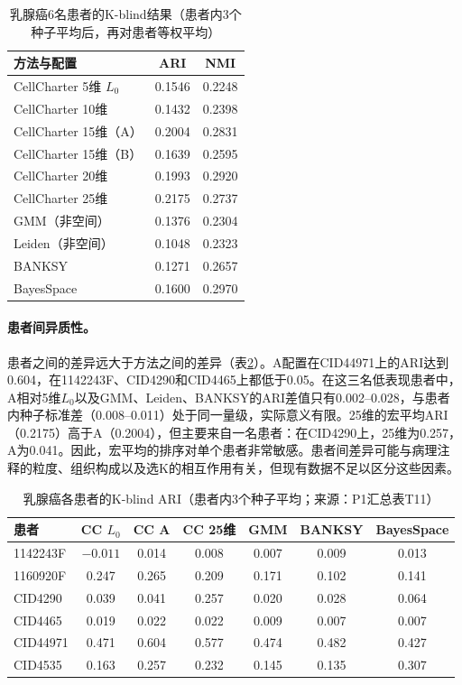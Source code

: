\begin{table}[htbp]
\centering
\caption{乳腺癌6名患者的K-blind结果（患者内3个种子平均后，再对患者等权平均）}
\label{tab:cc-external-p1}
\small
\begin{tabular}{lcc}
\toprule
方法与配置 & ARI & NMI\\
\midrule
CellCharter 5维 $L_0$ & 0.1546 & 0.2248\\
CellCharter 10维 & 0.1432 & 0.2398\\
CellCharter 15维（A） & 0.2004 & 0.2831\\
CellCharter 15维（B） & 0.1639 & 0.2595\\
CellCharter 20维 & 0.1993 & 0.2920\\
CellCharter 25维 & 0.2175 & 0.2737\\
GMM（非空间） & 0.1376 & 0.2304\\
Leiden（非空间） & 0.1048 & 0.2323\\
BANKSY & 0.1271 & 0.2657\\
BayesSpace & 0.1600 & 0.2970\\
\bottomrule
\end{tabular}
\end{table}

\paragraph{患者间异质性。}患者之间的差异远大于方法之间的差异（表\ref{tab:cc-patients-p1}）。A配置在CID44971上的ARI达到0.604，在1142243F、CID4290和CID4465上都低于0.05。在这三名低表现患者中，A相对5维$L_0$以及GMM、Leiden、BANKSY的ARI差值只有0.002--0.028，与患者内种子标准差（0.008--0.011）处于同一量级，实际意义有限。25维的宏平均ARI（0.2175）高于A（0.2004），但主要来自一名患者：在CID4290上，25维为0.257，A为0.041。因此，宏平均的排序对单个患者非常敏感。患者间差异可能与病理注释的粒度、组织构成以及选K的相互作用有关，但现有数据不足以区分这些因素。

\begin{table}[htbp]
\centering
\caption{乳腺癌各患者的K-blind ARI（患者内3个种子平均；来源：P1汇总表T11）}
\label{tab:cc-patients-p1}
\small
\begin{tabular}{lcccccc}
\toprule
患者 & CC $L_0$ & CC A & CC 25维 & GMM & BANKSY & BayesSpace\\
\midrule
1142243F & $-0.011$ & 0.014 & 0.008 & 0.007 & 0.009 & 0.013\\
1160920F & 0.247 & 0.265 & 0.209 & 0.171 & 0.102 & 0.141\\
CID4290 & 0.039 & 0.041 & 0.257 & 0.020 & 0.028 & 0.064\\
CID4465 & 0.019 & 0.022 & 0.022 & 0.009 & 0.007 & 0.007\\
CID44971 & 0.471 & 0.604 & 0.577 & 0.474 & 0.482 & 0.427\\
CID4535 & 0.163 & 0.257 & 0.232 & 0.145 & 0.135 & 0.307\\
\bottomrule
\end{tabular}
\end{table}

